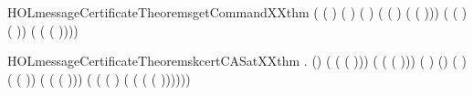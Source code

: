 \newcommand{\HOLmessageCertificateTheoremsgetCommandXXind}{\UseVerbatim{HOLmessageCertificateTheoremsgetCommandXXind}}
\begin{SaveVerbatim}{HOLmessageCertificateTheoremsgetCommandXXthm}
\HOLTokenTurnstile{} 
     ( ( ) ( ) ( )
        ( ( ) ( ( )))
        ( ( ) ( ))
        (  ( ( )))) \HOLSymConst{=}
\end{SaveVerbatim}
\newcommand{\HOLmessageCertificateTheoremsgetCommandXXthm}{\UseVerbatim{HOLmessageCertificateTheoremsgetCommandXXthm}}
\begin{SaveVerbatim}{HOLmessageCertificateTheoremskcertCASatXXthm}
\HOLTokenTurnstile{} \HOLSymConst{\HOLTokenForall{}}    .
     (\HOLSymConst{,}\HOLSymConst{,}) 
      ( ( ( ))) 
      ( ( ( )))   ( ) \HOLSymConst{\HOLTokenEquiv{}}
     (\HOLSymConst{,}\HOLSymConst{,}) 
      ( ) ( ( ))
       ( ( ( )))
       (
          ( ( )
             ( ( (\HOLSymConst{,} \HOLSymConst{,} ( ))))))
\end{SaveVerbatim}
\newcommand{\HOLmessageCertificateTheoremskcertCASatXXthm}{\UseVerbatim{HOLmessageCertificateTheoremskcertCASatXXthm}}
